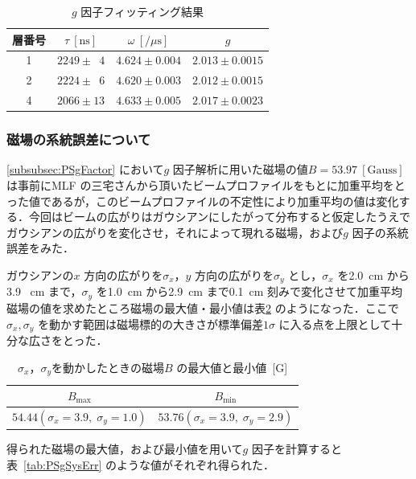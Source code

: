 \begin{table}[h]
	\centering
	\caption{$g$ 因子フィッティング結果}
	\begin{tabular}{cccc} \toprule
	層番号 & $\tau~[\mathrm{ns}]$ & $\omega~[/ \mu\mathrm{s}]$ & $g$ \\ \midrule
	1 & $2249 \pm \phantom{0}4$ & $4.624 \pm 0.004$ & $2.013 \pm 0.0015$ \\  
	2 & $2224 \pm \phantom{0}6$ & $4.620 \pm 0.003$ & $2.012 \pm 0.0015$ \\  
	4 & $2066 \pm 13$ & $4.633 \pm 0.005$ & $2.017 \pm 0.0023$ \\  \bottomrule
	\end{tabular}\label{tab:PSgFactor}
\end{table}%

\newpage

\subsubsection{磁場の系統誤差について}
\label{subsubsec:MagSysErr}
\ref{subsubsec:PSgFactor} において$g$ 因子解析に用いた磁場の値$B = 53.97~[\mathrm{Gauss}]$ は事前にMLF の三宅さんから頂いたビームプロファイルをもとに加重平均をとった値であるが，このビームプロファイルの不定性により加重平均の値は変化する．今回はビームの広がりはガウシアンにしたがって分布すると仮定したうえでガウシアンの広がりを変化させ，それによって現れる磁場，および$g$ 因子の系統誤差をみた．

ガウシアンの$x$ 方向の広がりを$\sigma_{x}$，$y$ 方向の広がりを$\sigma_{y}$ とし，$\sigma_{x}$ を2.0~cm から3.9 ~cm まで，$\sigma_{y}$ を1.0~cm から2.9~cm まで0.1~cm 刻みで変化させて加重平均磁場の値を求めたところ磁場の最大値・最小値は表\ref{tab:MagSysErr} のようになった．ここで$\sigma_{x}, \sigma_{y}$ を動かす範囲は磁場標的の大きさが標準偏差$1\sigma$ に入る点を上限として十分な広さをとった．

\begin{table}[h]
	\centering
	\caption{$\sigma_{x}$，$\sigma_{y}$を動かしたときの磁場$B$ の最大値と最小値~[G]}
	\begin{tabular}{cc}\toprule
	$B_{\mathrm{max}}$ & $B_{\mathrm{min}}$ \\ \midrule
	$54.44 (\sigma_{x} = 3.9, \;\sigma_{y} = 1.0)$ & $53.76 (\sigma_{x} = 3.9,\;\sigma_{y} = 2.9)$ \\ \bottomrule 	
	\end{tabular}\label{tab:MagSysErr}
\end{table}%

得られた磁場の最大値，および最小値を用いて$g$ 因子を計算すると表~\ref{tab:PSgSysErr} のような値がそれぞれ得られた．

